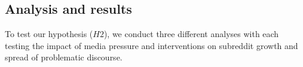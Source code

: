 % 
% 
% 
% 


\subsection{Analysis and results}

 To test our hypothesis ($H2$), we conduct three
different analyses with each testing the impact of media pressure and
interventions on subreddit growth and spread of problematic discourse.

